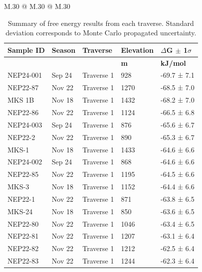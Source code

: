 \begin{landscape}
    
    \begin{table}
        \caption{Summary of free energy results from each traverse. Standard deviation corresponds to Monte Carlo propagated uncertainty.}
        \label{tab:delta_G}
        \scriptsize  %
        \setlength\tabcolsep{2mm}
        \begin{tabular}{M{.30\textwidth} @{\hspace{4cm}} M{.30\textwidth} @{\hspace{4cm}} M{.30\textwidth}}
            \begin{tabular}{l l l l l}
    \textbf{Sample ID}  &  \textbf{Season}  &  \textbf{Traverse}  &  \textbf{Elevation}  &  \textbf{$\Delta$G $\pm$ 1$\sigma$} \\
    \hline
    &   &   &  \textbf{m}  &  \textbf{kJ/mol} \\
    \hline
    NEP24-001 & Sep 24 & Traverse 1 & 928 & -69.7 ±  7.1 \\
    NEP22-87 & Nov 22 & Traverse 1 & 1270 & -68.5 ±  7.0 \\
    MKS 1B & Nov 18 & Traverse 1 & 1432 & -68.2 ±  7.0 \\
    NEP22-86 & Nov 22 & Traverse 1 & 1124 & -66.5 ±  6.8 \\
    NEP24-003 & Sep 24 & Traverse 1 & 876 & -65.6 ±  6.7 \\
    NEP22-2 & Nov 22 & Traverse 1 & 890 & -65.3 ±  6.7 \\
    MKS-1 & Nov 18 & Traverse 1 & 1433 & -64.6 ±  6.6 \\
    NEP24-002 & Sep 24 & Traverse 1 & 868 & -64.6 ±  6.6 \\
    NEP22-85 & Nov 22 & Traverse 1 & 1195 & -64.5 ±  6.6 \\
    MKS-3 & Nov 18 & Traverse 1 & 1152 & -64.4 ±  6.6 \\
    NEP22-1 & Nov 22 & Traverse 1 & 871 & -63.8 ±  6.5 \\
    MKS-24 & Nov 18 & Traverse 1 & 850 & -63.6 ±  6.5 \\
    NEP22-80 & Nov 22 & Traverse 1 & 1046 & -63.4 ±  6.5 \\
    NEP22-81 & Nov 22 & Traverse 1 & 1207 & -63.1 ±  6.4 \\
    NEP22-82 & Nov 22 & Traverse 1 & 1212 & -62.5 ±  6.4 \\
    NEP22-83 & Nov 22 & Traverse 1 & 1244 & -62.3 ±  6.4 \\

\end{tabular}
\end{tabular}
\end{table}
\end{landscape}
